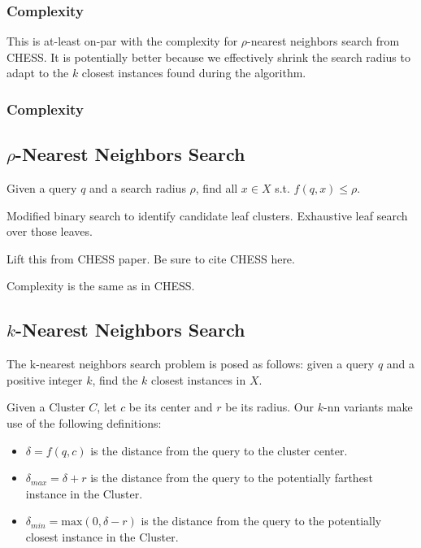 \subsubsection{Complexity}
\label{subsubsec:methods:knn-search:complexity}

This is at-least on-par with the complexity for $\rho$-nearest neighbors search from CHESS.
It is potentially better because we effectively shrink the search radius to adapt to the $k$ closest instances found during the algorithm.

\label{subsubsec:methods:clustering:proof-of-eventually-decreasing-cluster-radii}

\subsubsection {Complexity}

\subsection{\texorpdfstring{$\rho$}{p}-Nearest Neighbors Search}
\label{subsec:methods:rnn-search}

Given a query $q$ and a search radius $\rho$, find all $x \in X$ s.t. $f(q, x) \leq \rho$.

Modified binary search to identify candidate leaf clusters.
Exhaustive leaf search over those leaves.

Lift this from CHESS paper. Be sure to cite CHESS here.

Complexity is the same as in CHESS.

\subsection{\texorpdfstring{$k$}{k}-Nearest Neighbors Search}
\label{subsec:methods:knn-search}

The k-nearest neighbors search problem is posed as follows: given a query $q$ and a positive integer $k$, find the $k$ closest instances in $X$.

Given a Cluster $C$, let $c$ be its center and $r$ be its radius. Our $k$-nn variants make use of the following definitions:
\begin{itemize}
    \item $\delta = f(q, c)$ is the distance from the query to the cluster center.
    \item $\delta_{max} = \delta + r$ is the distance from the query to the potentially farthest instance in the Cluster.
    \item $\delta_{min} = \text{max}(0, \delta - r)$ is the distance from the query to the potentially closest instance in the Cluster.
\end{itemize}

